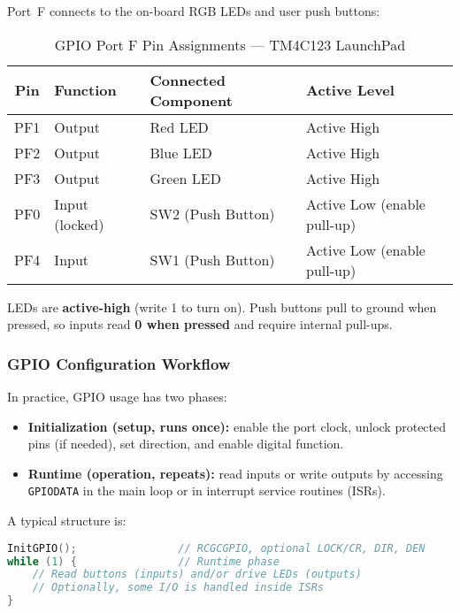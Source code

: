 Port~F connects to the on-board RGB LEDs and user push buttons:

\begin{table}[H]
\centering
\small
\renewcommand{\arraystretch}{1.2}
\begin{tabular}{clll}
\toprule
\textbf{Pin} & \textbf{Function} & \textbf{Connected Component} & \textbf{Active Level} \\
\midrule
PF1 & Output & Red LED & Active High \\
PF2 & Output & Blue LED & Active High \\
PF3 & Output & Green LED & Active High \\
PF0 & Input (locked) & SW2 (Push Button) & Active Low (enable pull-up) \\
PF4 & Input & SW1 (Push Button) & Active Low (enable pull-up) \\
\bottomrule
\end{tabular}
\caption{GPIO Port F Pin Assignments — TM4C123 LaunchPad}
\end{table}

\noindent
LEDs are \textbf{active-high} (write 1 to turn on). Push buttons pull to ground when pressed, so inputs read \textbf{0 when pressed} and require internal pull-ups.
\bigskip

\subsubsection{GPIO Configuration Workflow}

In practice, GPIO usage has two phases:

\begin{itemize}[nosep]
  \item \textbf{Initialization (setup, runs once):} enable the port clock, unlock protected pins (if needed), set direction, and enable digital function.
  \item \textbf{Runtime (operation, repeats):} read inputs or write outputs by accessing \texttt{GPIODATA} in the main loop or in interrupt service routines (ISRs).
\end{itemize}

\noindent
A typical structure is:

\begin{lstlisting}[language=C,caption={Typical GPIO program structure (setup vs. runtime)}]
InitGPIO();                // RCGCGPIO, optional LOCK/CR, DIR, DEN
while (1) {                // Runtime phase
    // Read buttons (inputs) and/or drive LEDs (outputs)
    // Optionally, some I/O is handled inside ISRs
}
\end{lstlisting}

